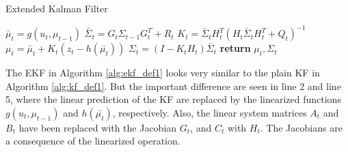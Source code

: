 \begin{center}
\begin{minipage}{.65\linewidth}
\begin{algorithm}[H]
\caption{Extended Kalman Filter}
\label{alg:ekf_def1}
\begin{algorithmic}[1]
  \State $\bar\mu_{t} = g(u_t,\mu_{t-1})$
  \State $\bar\Sigma_{t} = G_{t}\Sigma_{t-1}G_{t}^T + R_{t}$
  \State $K_{t} = \bar\Sigma_{t}H_{t}^T(H_{t}\bar{\Sigma}_{t}H_{t}^T+Q_{t})^{-1}$
  \State $\mu_{t} = \bar\mu_{t} + K_{t}(z_{t} - h(\bar{\mu_t}))$
  \State $\Sigma_{t} = (I - K_{t}H_{t})\bar\Sigma_{t}$
  \State \textbf{return} $\mu_{t}, \Sigma_{t}$
\EndProcedure
\end{algorithmic}
\end{algorithm}
\end{minipage}
\end{center}

The EKF in Algorithm \ref{alg:ekf_def1} looks very similar to the plain KF in Algorithm \ref{alg:kf_def1}. But the important difference are seen in line 2 and line 5, where the linear prediction of the KF are replaced by the linearized functions $g(u_t,\mu_{t-1})$ and $h(\bar{\mu_t})$, respectively. Also, the linear system matrices $A_t$ and $B_t$ have been replaced with the Jacobian $G_t$, and $C_t$ with $H_t$. The Jacobians are a consequence of the linearized operation.
